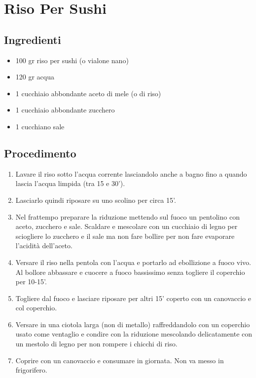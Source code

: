 \section{Riso Per Sushi}
\subsection{Ingredienti}
\begin{itemize}
\item 100 gr riso per sushi (o vialone nano)  
\item 120 gr acqua  
\item 1 cucchiaio abbondante aceto di mele (o di riso)  
\item 1 cucchiaio abbondante zucchero  
\item 1 cucchiano sale
\end{itemize}
\subsection{Procedimento}
\begin{enumerate}
\item  Lavare il riso sotto l'acqua corrente lasciandolo anche a bagno fino a quando lascia l'acqua limpida (tra 15 e 30').   
\item  Lasciarlo quindi riposare su uno scolino per circa 15'.   
\item  Nel frattempo preparare la riduzione mettendo sul fuoco un pentolino con aceto, zucchero e sale. Scaldare e mescolare con un cucchiaio di legno per sciogliere lo zucchero e il sale ma non fare bollire per non fare evaporare l'acidità dell'aceto.  
\item  Versare il riso nella pentola con l'acqua e portarlo ad ebollizione a fuoco vivo. Al bollore abbassare e cuocere a fuoco bassissimo senza togliere il coperchio per 10-15'.  
\item  Togliere dal fuoco e lasciare riposare per altri 15' coperto con un canovaccio e col coperchio.  
\item  Versare in una ciotola larga (non di metallo) raffreddandolo con un coperchio usato come ventaglio e condire con la riduzione mescolando delicatamente con un mestolo di legno per non rompere i chicchi di riso.  
\item  Coprire con un canovaccio e consumare in giornata. Non va messo in frigorifero. 
\end{enumerate}
